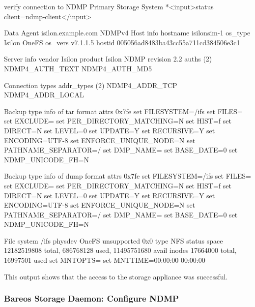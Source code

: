 \begin{bconsole}{verify connection to NDMP Primary Storage System}
*<input>status client=ndmp-client</input>

Data Agent isilon.example.com NDMPv4
  Host info
    hostname   isilonsim-1
    os_type    Isilon OneFS
    os_vers    v7.1.1.5
    hostid     005056ad8483ba43cc55a711cd384506e3c1

  Server info
    vendor     Isilon
    product    Isilon NDMP
    revision   2.2
    auths      (2) NDMP4_AUTH_TEXT NDMP4_AUTH_MD5

  Connection types
    addr_types (2) NDMP4_ADDR_TCP NDMP4_ADDR_LOCAL

  Backup type info of tar format
    attrs      0x7fe
    set        FILESYSTEM=/ifs
    set        FILES=
    set        EXCLUDE=
    set        PER_DIRECTORY_MATCHING=N
    set        HIST=f
    set        DIRECT=N
    set        LEVEL=0
    set        UPDATE=Y
    set        RECURSIVE=Y
    set        ENCODING=UTF-8
    set        ENFORCE_UNIQUE_NODE=N
    set        PATHNAME_SEPARATOR=/
    set        DMP_NAME=
    set        BASE_DATE=0
    set        NDMP_UNICODE_FH=N

  Backup type info of dump format
    attrs      0x7fe
    set        FILESYSTEM=/ifs
    set        FILES=
    set        EXCLUDE=
    set        PER_DIRECTORY_MATCHING=N
    set        HIST=f
    set        DIRECT=N
    set        LEVEL=0
    set        UPDATE=Y
    set        RECURSIVE=Y
    set        ENCODING=UTF-8
    set        ENFORCE_UNIQUE_NODE=N
    set        PATHNAME_SEPARATOR=/
    set        DMP_NAME=
    set        BASE_DATE=0
    set        NDMP_UNICODE_FH=N

  File system /ifs
    physdev    OneFS
    unsupported 0x0
    type       NFS
    status
    space      12182519808 total, 686768128 used, 11495751680 avail
    inodes     17664000 total, 16997501 used
    set        MNTOPTS=
    set        MNTTIME=00:00:00 00:00:00
\end{bconsole}

This output shows that the access to the storage appliance was successful.



\subsubsection{Bareos Storage Daemon: Configure NDMP}
\label{sec:ndmp-sd-configure}


